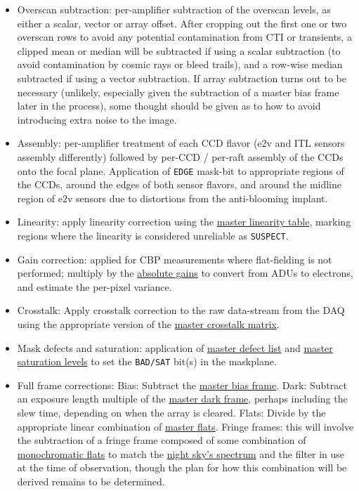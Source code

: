 \begin{itemize}

\item Overscan subtraction: per-amplifier subtraction of the overscan levels, as either a scalar, vector or array offset. After cropping out the first one or two overscan rows to avoid any potential contamination from CTI or transients, a clipped mean or median will be subtracted if using a scalar subtraction (to avoid contamination by cosmic rays or bleed trails), and a row-wise median subtracted if using a vector subtraction. If array subtraction turns out to be necessary (unlikely, especially given the subtraction of a master bias frame later in the process), some thought should be given as to how to avoid introducing extra noise to the image.

\item Assembly: per-amplifier treatment of each CCD flavor (e2v and ITL sensors assembly differently) followed by per-CCD / per-raft assembly of the CCDs onto the focal plane. Application of \texttt{EDGE} mask-bit to appropriate regions of the CCDs, \ie around the edges of both sensor flavors, and around the midline region of e2v sensors due to distortions from the anti-blooming implant.

\item Linearity: apply linearity correction using the \hyperref[sec:CPP:output:linearityCurve]{master linearity table}, marking
regions where the linearity is considered unreliable as \texttt{SUSPECT}.

\item Gain correction: applied for CBP measurements where flat-fielding is not performed; multiply by the \hyperref[sec:CPP:output:gains]{absolute gains} to convert from ADUs to electrons, and estimate the per-pixel variance.

\item Crosstalk: Apply crosstalk correction to the raw data-stream from the DAQ using the appropriate version of the \hyperref[sec:CPP:output:crosstalk]{master crosstalk matrix}.

\item Mask defects and saturation: application of \hyperref[sec:CPP:output:defectList]{master defect list} and \hyperref[sec:CPP:output:saturationLevel]{master saturation levels} to set the \texttt{BAD/SAT} bit(s) in the maskplane.

\item Full frame corrections:	
	\mysubitem Bias: Subtract the \hyperref[sec:CPP:output:bias]{master bias frame}.
	\mysubitem Dark: Subtract an exposure length multiple of the \hyperref[sec:CPP:output:dark]{master dark frame}, perhaps including the slew time, depending on when the array is cleared.
	\mysubitem Flats: Divide by the appropriate linear combination of  \hyperref[sec:CPP:output:monoPhotoFlat]{master flats}.
	\mysubitem Fringe frames: this will involve the subtraction of a fringe frame composed of some combination of \hyperref[sec:CPP:output:monoFlat]{monochromatic flats} to match the \hyperref[sec:CPP:aux:nightSkySpectrum]{night sky's spectrum} and the filter in use at the time of observation, though the plan for how this combination will be derived remains to be determined.



\end{itemize}

